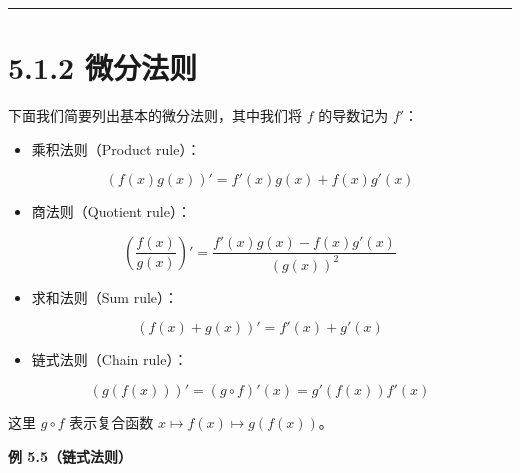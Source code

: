 \medskip\hrule\medskip

\section*{5.1.2 微分法则}

下面我们简要列出基本的微分法则，其中我们将 $ f $ 的导数记为 $ f' $：

\begin{itemize}
\item 乘积法则（Product rule）：
\end{itemize}

\begin{equation}
(f(x)g(x))' = f'(x)g(x) + f(x)g'(x)
\tag{5.29}\label{eq:5-29}
\end{equation}

\begin{itemize}
\item 商法则（Quotient rule）：
\end{itemize}

\begin{equation}
\left( \frac{f(x)}{g(x)} \right)' = \frac{f'(x)g(x) - f(x)g'(x)}{(g(x))^2}
\tag{5.30}\label{eq:5-30}
\end{equation}

\begin{itemize}
\item 求和法则（Sum rule）：
\end{itemize}

\begin{equation}
(f(x) + g(x))' = f'(x) + g'(x)
\tag{5.31}\label{eq:5-31}
\end{equation}

\begin{itemize}
\item 链式法则（Chain rule）：
\end{itemize}

\begin{equation}
(g(f(x)))' = (g \circ f)'(x) = g'(f(x))f'(x)
\tag{5.32}\label{eq:5-32}
\end{equation}

这里 $ g \circ f $ 表示复合函数 $ x \mapsto f(x) \mapsto g(f(x)) $。

\begin{notebox}
\textbf{例 5.5（链式法则）}
\end{notebox}

